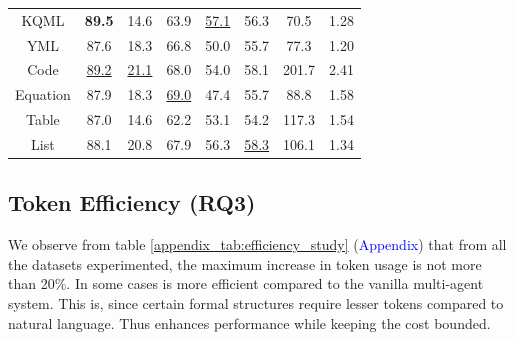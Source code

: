 \begin{table}[t!]
{\begin{tabular}{c c c c c c | c c}
        KQML & \textbf{89.5} & 14.6 & 63.9 & \underline{57.1} & 56.3 & 70.5 & 1.28 \\
        YML & 87.6 & 18.3 & 66.8 & 50.0 & 55.7 & 77.3 & 1.20 \\
        Code & \underline{89.2} & \underline{21.1} & 68.0 & 54.0 & 58.1 & 201.7 & 2.41 \\
        Equation & 87.9 & 18.3 & \underline{69.0} & 47.4 & 55.7 & 88.8 & 1.58 \\
        Table  & 87.0 & 14.6 & 62.2 & 53.1 & 54.2 & 117.3 & 1.54 \\
        List & 88.1 & 20.8 & 67.9 & 56.3 & \underline{58.3} & 106.1 & 1.34 \\
        \hline
        
        \hline
    \end{tabular}
    }
\end{table}

\subsection{Token Efficiency (RQ3)}
We observe from table \ref{appendix_tab:efficiency_study} (\textcolor{blue}{Appendix}) that from all the datasets experimented, the maximum increase in token usage is not more than 20\%. In some cases \method is more efficient compared to the vanilla multi-agent system. This is, since certain formal structures require lesser tokens compared to natural language. Thus \method enhances performance while keeping the cost bounded.


